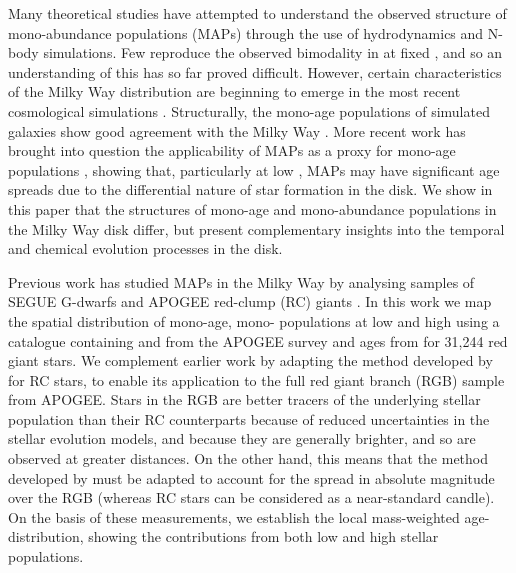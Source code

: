 Many theoretical studies have attempted to understand the observed structure of mono-abundance populations (MAPs) through the use of hydrodynamics and N-body simulations. Few reproduce the observed bimodality in \afe{} at fixed \feh{}, and so an understanding of this has so far proved difficult. However, certain characteristics of the Milky Way \afe{} distribution are beginning to emerge in the most recent cosmological simulations  \citep{2016arXiv160804133M}. Structurally, the mono-age populations of simulated galaxies show good agreement with the Milky Way \citep[e.g.][]{2013MNRAS.436..625S,2013ApJ...773...43B,2014MNRAS.442.2474M,2014MNRAS.443.2452M}. More recent work has brought into question the applicability of MAPs as a proxy for mono-age populations \citep{2017ApJ...834...27M}, showing that, particularly at low \afe{}, MAPs may have significant age spreads due to the differential nature of star formation in the disk. We show in this paper that the structures of mono-age and mono-abundance populations in the Milky Way disk differ, but present complementary insights into the temporal and chemical evolution processes in the disk.

Previous work has studied MAPs in the Milky Way by analysing samples of SEGUE G-dwarfs \citep{2012ApJ...755..115B,2012ApJ...753..148B,2012ApJ...751..131B} and APOGEE red-clump (RC) giants \citep{2016ApJ...823...30B}. In this work we map the spatial distribution of mono-age, mono-\feh{} populations at low and high \afe{} using a catalogue containing \feh{} and \afe{} from the APOGEE survey \citep{2015arXiv150905420M} and ages from \citet{2016MNRAS.456.3655M} for 31,244 red giant stars. We complement earlier work by adapting the method developed by \citet{2016ApJ...823...30B} for RC stars, to enable its application to the full red giant branch (RGB) sample from APOGEE. Stars in the RGB are better tracers of the underlying stellar population than their RC counterparts because of reduced uncertainties in the stellar evolution models, and because they are generally brighter, and so are observed at greater distances. On the other hand, this means that the method developed by  \citet{2016ApJ...823...30B} must be adapted to account for the spread in absolute magnitude over the RGB (whereas RC stars can be considered as a near-standard candle). On the basis of these measurements, we establish the local mass-weighted age-\feh{} distribution, showing the contributions from both low and high \afe{} stellar populations.


